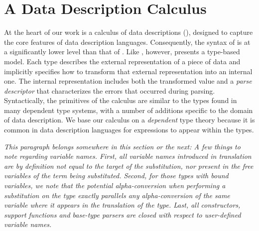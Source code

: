 \section{A Data Description Calculus}

At the heart of our work is a calculus of data descriptions (\ddc{}),
designed to capture the core features of data description languages. Consequently, the syntax of \ddc{} is at a significantly lower level than that of \ipads{}.  Like \ipads{}, however, \ddc{} presents a type-based model.  Each \ddc{} type describes the external representation of a piece of data and implicitly specifies how to transform that external representation into an internal one.  The internal representation includes both the transformed value and a \textit{parse descriptor} that characterizes the errors that occurred during parsing. Syntactically, the primitives of the calculus are
similar to the types found in many dependent type systems, with a
number of additions specific to the domain of data description.  
We base our calculus on a \textit{dependent} type theory
because it is common in data description languages for expressions to appear within the types. 


{\em This paragraph belongs somewhere in this section or the next:
A few things to note regarding variable names. First, all variable
names introduced in translation are by definition not equal to the
target of the substitution, nor present in the free variables of the
term being substituted. Second, for those types with bound variables,
we note that the potential alpha-conversion when performing a
substitution on the type exactly parallels any alpha-conversion of the
same variable where it appears in the translation of the type. Last,
all constructors, support functions and base-type parsers are closed
with respect to user-defined variable names.}

